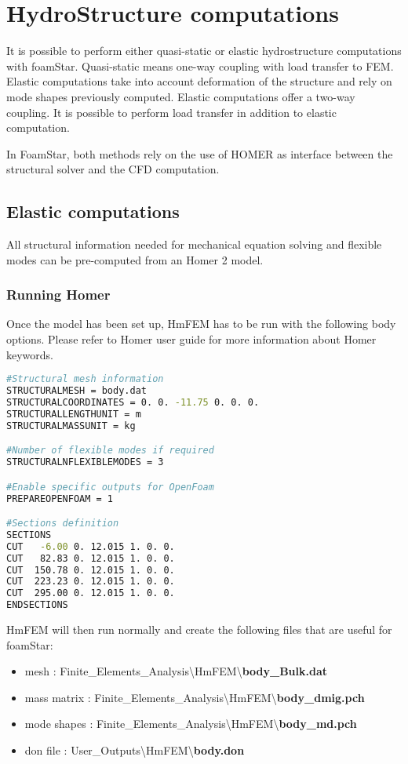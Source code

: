 \chapter{HydroStructure computations}
\label{homer}

It is possible to perform either quasi-static or elastic hydrostructure computations with foamStar. Quasi-static means one-way coupling with load transfer to FEM. Elastic computations take into account deformation of the structure and rely on mode shapes previously computed. Elastic computations offer a two-way coupling. It is possible to perform load transfer in addition to elastic computation.

In FoamStar, both methods rely on the use of HOMER as interface between the structural solver and the CFD computation.


\section{Elastic computations}

All structural information needed for mechanical equation solving and flexible modes can be pre-computed from an Homer 2 model.

\subsection{Running Homer}
Once the model has been set up, HmFEM has to be run with the following body options. Please refer to Homer user guide for more information about Homer keywords.

\begin{lstlisting}[language=bash]
#Structural mesh information
STRUCTURALMESH = body.dat
STRUCTURALCOORDINATES = 0. 0. -11.75 0. 0. 0.
STRUCTURALLENGTHUNIT = m
STRUCTURALMASSUNIT = kg

#Number of flexible modes if required
STRUCTURALNFLEXIBLEMODES = 3

#Enable specific outputs for OpenFoam
PREPAREOPENFOAM = 1

#Sections definition
SECTIONS
CUT   -6.00 0. 12.015 1. 0. 0.
CUT   82.83 0. 12.015 1. 0. 0.
CUT  150.78 0. 12.015 1. 0. 0.
CUT  223.23 0. 12.015 1. 0. 0.
CUT  295.00 0. 12.015 1. 0. 0.
ENDSECTIONS
\end{lstlisting}

HmFEM will then run normally and create the following files that are useful for foamStar:
\begin{itemize}
\item mesh : Finite\_Elements\_Analysis{\textbackslash}HmFEM{\textbackslash}\textbf{body\_Bulk.dat}
\item mass matrix : Finite\_Elements\_Analysis{\textbackslash}HmFEM{\textbackslash}\textbf{body\_dmig.pch}
\item mode shapes : Finite\_Elements\_Analysis{\textbackslash}HmFEM{\textbackslash}\textbf{body\_md.pch}
\item don file : User\_Outputs{\textbackslash}HmFEM{\textbackslash}\textbf{body.don}
\end{itemize}

